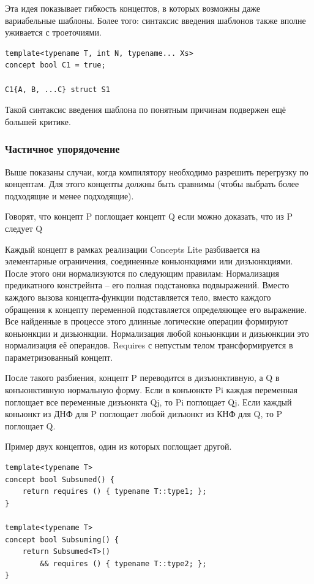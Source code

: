 \documentclass[a4paper,12pt,oneside]{article}
\begin{document}
Эта идея показывает гибкость концептов, в которых возможны даже вариабельные шаблоны. Более того: синтаксис введения шаблонов также вполне уживается с троеточиями.

\begin{lstlisting}
template<typename T, int N, typename... Xs> 
concept bool C1 = true;

C1{A, B, ...C} struct S1
\end{lstlisting}

Такой синтаксис введения шаблона по понятным причинам подвержен ещё большей критике.

\subsubsection{Частичное упорядочение}

Выше показаны случаи, когда компилятору необходимо разрешить перегрузку по концептам. Для этого концепты должны быть сравнимы (чтобы выбрать более подходящие и менее подходящие).

Говорят, что концепт P поглощает концепт Q если можно доказать, что из P следует Q

Каждый концепт в рамках реализации Concepts Lite разбивается на элементарные ограничения, соединенные коньюнкциями или дизъюнкциями. После этого они нормализуются по следующим правилам:
Нормализация предикатного констрейнта -- его полная подстановка подвыражений. Вместо каждого вызова концепта-функции подставляется тело, вместо каждого обращения к концепту переменной подставляется определяющее его выражение. Все найденные в процессе этого длинные логические операции формируют коньюнкции и дизьюнкции.
Нормализация любой коньюнкции и дизьюнкции это нормализация её операндов.
Requires с непустым телом трансформируется в параметризованный концепт.

После такого разбиения, концепт P переводится в дизъюнктивную, а Q в конъюнктивную нормальную форму. Если в конъюнкте Pi каждая переменная поглощает все переменные дизъюнкта Qj, то Pi поглощает Qj. Если каждый коньюнкт из ДНФ для P поглощает любой дизъюнкт из КНФ для Q, то P поглощает Q.

Пример двух концептов, один из которых поглощает другой.

\begin{lstlisting}
template<typename T>
concept bool Subsumed() {
    return requires () { typename T::type1; };
}

template<typename T>
concept bool Subsuming() {
    return Subsumed<T>()
        && requires () { typename T::type2; };
}
\end{lstlisting}
\end{document}
